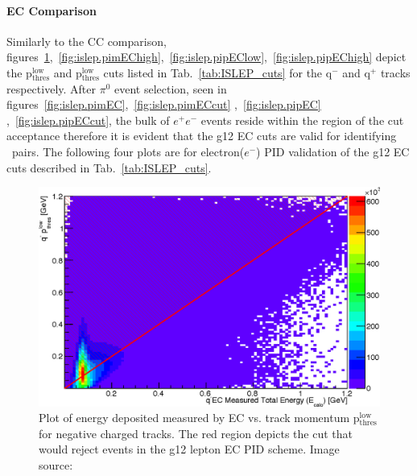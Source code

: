 \FloatBarrier

\paragraph{\label{sec:data.lepton.ec}EC Comparison}
		
		Similarly to the CC comparison, figures~\ref{fig:islep.pimEClow},~\ref{fig:islep.pimEChigh},~\ref{fig:islep.pipEClow},~\ref{fig:islep.pipEChigh} depict the  p$\mathrm{_{thres}^{low}}$ and  p$\mathrm{_{thres}^{low}}$ cuts listed in Tab.~\ref{tab:ISLEP_cuts} for the q$^-$ and q$^+$ tracks respectively. After $\pi^0$ event selection, seen in figures~\ref{fig:islep.pimEC},~\ref{fig:islep.pimECcut} ,~\ref{fig:islep.pipEC} ,~\ref{fig:islep.pipECcut}, the bulk of $e^+e^-$ events reside within the region of the cut acceptance therefore it is evident that the g12 EC cuts are valid for identifying \epemT \ pairs. The following four plots are for electron($e^-$) PID validation of the g12 EC cuts described in Tab.~\ref{tab:ISLEP_cuts}.
\begin{figure}\begin{center}
				\includegraphics[width=0.8\figwidth]{figures/lepton/Pim_EClow.eps}
				\caption[EC Deposited Energy Comparison to Lower Threshold Track Momentum for q$^-$ Tracks]{\label{fig:islep.pimEClow}Plot of energy deposited measured by EC vs. track momentum p$\mathrm{_{thres}^{low}}$ for negative charged tracks. The red region depicts the cut that would reject events in the g12 lepton EC PID scheme. Image source:~\cite{thesiskunkel}}
\end{center}\end{figure}
			
